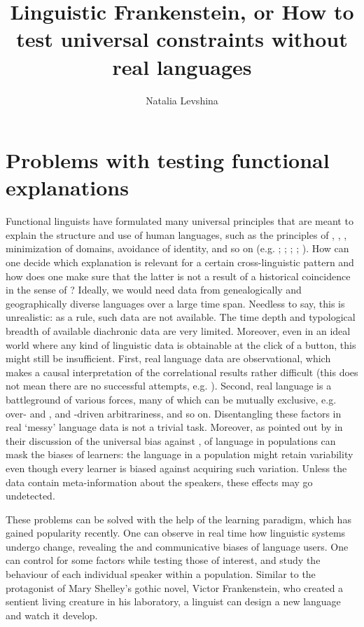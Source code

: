 \documentclass[output=paper]{langsci/langscibook}
\author{Natalia Levshina\affiliation{Leipzig University}}
\title{Linguistic {Frankenstein}, or {How} to test universal constraints without real languages}
\begin{document}
\maketitle 
 

\section{Problems with testing functional explanations}

Functional linguists have formulated many universal principles that are meant to explain the structure and use of human languages, such as the principles of , ,  , minimization of domains, avoidance of identity, and so on (e.g. \citealt{Haiman1983}; \citealt{Rohdenburg1996}; \citealt{Rohdenburg2003}; \citealt{Hawkins2004}; \citealt{Haspelmath2008_FreqIcon}). How can one decide which explanation is relevant for a certain cross-linguistic pattern and how does one make sure that the latter is not a result of a historical coincidence in the sense of ? Ideally, we would need data from genealogically and geographically diverse languages over a large time span. Needless to say, this is unrealistic: as a rule, such data are not available. The time depth and typological breadth of available diachronic data are very limited. Moreover, even in an ideal world where any kind of linguistic data is obtainable at the click of a button, this might still be insufficient. First, real language data are observational, which makes a causal interpretation of the correlational results rather difficult (this does not mean there are no successful attempts, e.g. \citealt{Prado2014}). Second, real language is a battleground of various forces, many of which can be mutually exclusive, e.g. over- and ,  and -driven arbitrariness, and so on. Disentangling these factors in real ‘messy’ language data is not a trivial task. Moreover, as pointed out by \citet{SmithEtAl2017} in their discussion of the universal bias against ,  of language in populations can mask the biases of learners: the language in a population might retain variability even though every learner is biased against acquiring such variation. Unless the data contain meta-information about the speakers, these effects may go undetected.

These problems can be solved with the help of the  learning paradigm, which has gained popularity recently. One can observe in real time how linguistic systems undergo change, revealing the  and communicative biases of language users. One can control for some factors while testing those of interest, and study the behaviour of each individual speaker within a population. Similar to the protagonist of Mary Shelley’s gothic novel, Victor Frankenstein, who created a sentient living creature in his laboratory, a linguist can design a new language and watch it develop. 
\end{document}
